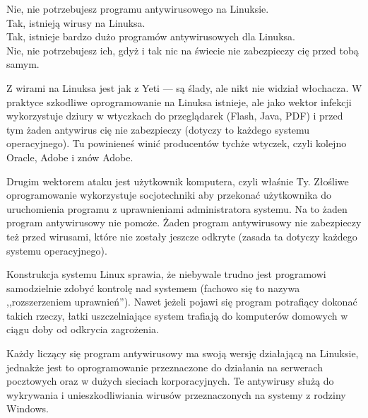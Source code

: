 \noindent \textcolor{ubuntu_orange}{Nie}, nie potrzebujesz programu antywirusowego na Linuksie.\\
\textcolor{ubuntu_orange}{Tak}, istnieją wirusy na Linuksa.\\
\textcolor{ubuntu_orange}{Tak}, istnieje bardzo dużo programów antywirusowych dla Linuksa.\\
\textcolor{ubuntu_orange}{Nie}, nie potrzebujesz ich, gdyż i tak nic na świecie nie zabezpieczy cię przed tobą samym.

Z wirami na Linuksa jest jak z Yeti --- są ślady, ale nikt nie widział włochacza. W praktyce szkodliwe oprogramowanie na Linuksa istnieje, ale jako wektor infekcji wykorzystuje dziury w wtyczkach do przeglądarek (Flash, Java, PDF) i przed tym żaden antywirus cię nie zabezpieczy (dotyczy to każdego systemu operacyjnego). Tu powinieneś winić producentów tychże wtyczek, czyli kolejno Oracle, Adobe i znów Adobe.

Drugim wektorem ataku jest użytkownik komputera, czyli właśnie Ty. Złośliwe oprogramowanie wykorzystuje socjotechniki aby przekonać użytkownika do uruchomienia programu z uprawnieniami administratora systemu. Na to żaden program antywirusowy nie pomoże. Żaden program antywirusowy nie zabezpieczy też przed wirusami, które nie zostały jeszcze odkryte (zasada ta dotyczy każdego systemu operacyjnego).

Konstrukcja systemu Linux sprawia, że niebywale trudno jest programowi samodzielnie zdobyć kontrolę nad systemem (fachowo się to nazywa ,,rozszerzeniem uprawnień''). Nawet jeżeli pojawi się program potrafiący dokonać takich rzeczy, łatki uszczelniające system trafiają do komputerów domowych w ciągu doby od odkrycia zagrożenia.

Każdy liczący się program antywirusowy ma swoją wersję działającą na Linuksie, jednakże jest to oprogramowanie przeznaczone do działania na serwerach pocztowych oraz w dużych sieciach korporacyjnych. Te antywirusy służą do wykrywania i unieszkodliwiania wirusów przeznaczonych na systemy z rodziny Windows.

